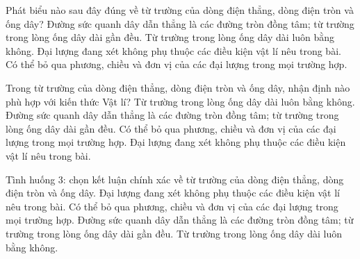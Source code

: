 \begin{ex}
Phát biểu nào sau đây đúng về từ trường của dòng điện thẳng, dòng điện tròn và ống dây?
\choice
{\True Đường sức quanh dây dẫn thẳng là các đường tròn đồng tâm; từ trường trong lòng ống dây dài gần đều.}
{Từ trường trong lòng ống dây dài luôn bằng không.}
{Đại lượng đang xét không phụ thuộc các điều kiện vật lí nêu trong bài.}
{Có thể bỏ qua phương, chiều và đơn vị của các đại lượng trong mọi trường hợp.}
\end{ex}

\begin{ex}
Trong từ trường của dòng điện thẳng, dòng điện tròn và ống dây, nhận định nào phù hợp với kiến thức Vật lí?
\choice
{Từ trường trong lòng ống dây dài luôn bằng không.}
{\True Đường sức quanh dây dẫn thẳng là các đường tròn đồng tâm; từ trường trong lòng ống dây dài gần đều.}
{Có thể bỏ qua phương, chiều và đơn vị của các đại lượng trong mọi trường hợp.}
{Đại lượng đang xét không phụ thuộc các điều kiện vật lí nêu trong bài.}
\end{ex}

\begin{ex}
Tình huống 3: chọn kết luận chính xác về từ trường của dòng điện thẳng, dòng điện tròn và ống dây.
\choice
{Đại lượng đang xét không phụ thuộc các điều kiện vật lí nêu trong bài.}
{Có thể bỏ qua phương, chiều và đơn vị của các đại lượng trong mọi trường hợp.}
{\True Đường sức quanh dây dẫn thẳng là các đường tròn đồng tâm; từ trường trong lòng ống dây dài gần đều.}
{Từ trường trong lòng ống dây dài luôn bằng không.}
\end{ex}

